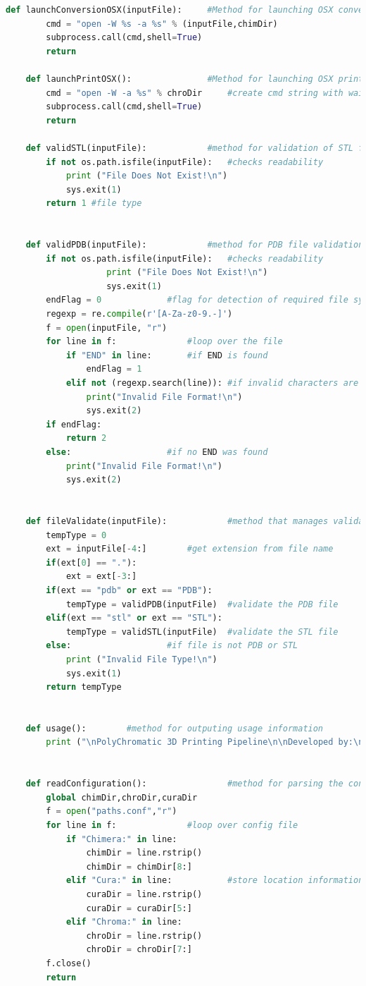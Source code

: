 \documentclass[letterpaper, onecolumn, draftclsnofoot, 10pt, compsoc]{IEEEtran}
\begin{document}
\begin{singlespace}
\begin{lstlisting}[language=Python]
	def launchConversionOSX(inputFile):		#Method for launching OSX conversion software
		cmd = "open -W %s -a %s" % (inputFile,chimDir)
		subprocess.call(cmd,shell=True)
		return
	
	def launchPrintOSX():				#Method for launching OSX printing software
		cmd = "open -W -a %s" % chroDir		#create cmd string with wait flag to hold execution
		subprocess.call(cmd,shell=True)
		return
		
	def validSTL(inputFile):			#method for validation of STL files
		if not os.path.isfile(inputFile):	#checks readability
			print ("File Does Not Exist!\n")	
			sys.exit(1)
		return 1 #file type
	
	
	def validPDB(inputFile):			#method for PDB file validation
		if not os.path.isfile(inputFile):	#checks readability
					print ("File Does Not Exist!\n")
					sys.exit(1)
		endFlag = 0				#flag for detection of required file syntax
		regexp = re.compile(r'[A-Za-z0-9.-]')
		f = open(inputFile, "r")
		for line in f:				#loop over the file
			if "END" in line:		#if END is found
				endFlag = 1
			elif not (regexp.search(line)):	#if invalid characters are found
				print("Invalid File Format!\n")
				sys.exit(2)
		if endFlag:
			return 2
		else:					#if no END was found
			print("Invalid File Format!\n")
			sys.exit(2)
	
	
	def fileValidate(inputFile):			#method that manages validation
		tempType = 0
		ext = inputFile[-4:]		#get extension from file name
		if(ext[0] == "."):
			ext = ext[-3:]
		if(ext == "pdb" or ext == "PDB"):
			tempType = validPDB(inputFile)	#validate the PDB file
		elif(ext == "stl" or ext == "STL"):
			tempType = validSTL(inputFile)  #validate the STL file
		else:					#if file is not PDB or STL
			print ("Invalid File Type!\n")
			sys.exit(1)
		return tempType
	
	
	def usage():		#method for outputing usage information
		print ("\nPolyChromatic 3D Printing Pipeline\n\nDeveloped by:\n\tJoshua Lioy, Corynna Park, Jackson Wells\n\nUsage:\n\tpython polyPipeline.py [Optional Flags] [-w or -m]  -i [input file]\n\nFlags:\n\t-h\tdisplayes usage\n\t-i\tto input file\n\t-v\tfor verbose program output\n\t-w\tsets operating system to Windows\n\t-m\tsets operating system to OSX\n\n")
	
	
	def readConfiguration():				#method for parsing the configuration file
		global chimDir,chroDir,curaDir		
		f = open("paths.conf","r") 
		for line in f:				#loop over config file
			if "Chimera:" in line:	
				chimDir = line.rstrip()
				chimDir = chimDir[8:]
			elif "Cura:" in line:			#store location information
				curaDir = line.rstrip()
				curaDir = curaDir[5:]	
			elif "Chroma:" in line:	
				chroDir = line.rstrip()
				chroDir = chroDir[7:]		
		f.close()
		return
	

\end{lstlisting}
\end{singlespace}
\end{document}
